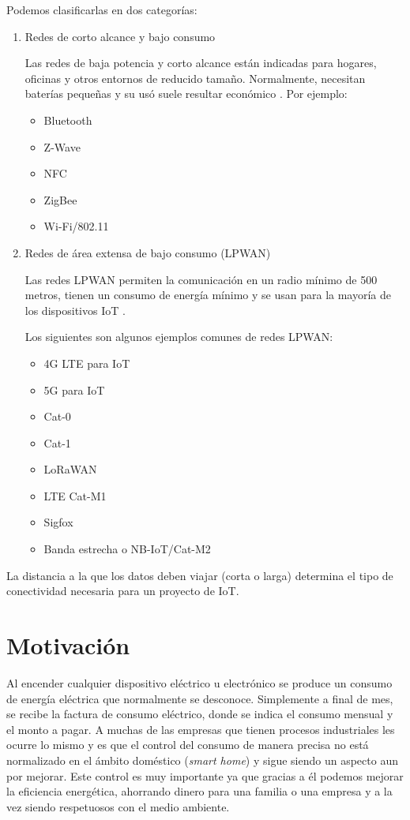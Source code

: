 Podemos clasificarlas en dos categorías:
\begin{enumerate}
\item Redes de corto alcance y bajo consumo 

Las redes de baja potencia y corto alcance están indicadas para hogares, oficinas y otros entornos de reducido tamaño. Normalmente, necesitan baterías pequeñas y su usó suele resultar económico \citep{WEBSITE:15}. Por ejemplo:

\begin{itemize}
\item Bluetooth
\item Z-Wave
\item NFC
\item ZigBee
\item Wi-Fi/802.11
\end{itemize}


\item Redes de área extensa de bajo consumo (LPWAN)

Las redes LPWAN permiten la comunicación en un radio mínimo de 500 metros, tienen un consumo de energía mínimo y se usan para la mayoría de los dispositivos IoT \citep{WEBSITE:15}. 

Los siguientes son algunos ejemplos comunes de redes LPWAN:

\begin{itemize}
\item 4G LTE para IoT
\item 5G para IoT
\item Cat-0
\item Cat-1
\item LoRaWAN
\item LTE Cat-M1
\item Sigfox
\item Banda estrecha o NB-IoT/Cat-M2
\end{itemize}

\end{enumerate}

\vspace{0.5cm}

La distancia a la que los datos deben viajar (corta o larga) determina el tipo de conectividad necesaria para un proyecto de IoT.


\section{Motivación}
Al encender cualquier dispositivo eléctrico u electrónico se produce un consumo de energía eléctrica que normalmente se desconoce. Simplemente a final de mes, se recibe la factura de consumo eléctrico, donde se indica el consumo mensual y el monto a pagar. A muchas de las empresas que tienen procesos industriales les ocurre lo mismo y es que el control del consumo de manera precisa no está normalizado en el ámbito doméstico (\emph{smart home}) y sigue siendo un aspecto aun por mejorar. Este control es muy importante ya que gracias a él podemos mejorar la eficiencia energética, ahorrando dinero para una familia o una empresa y a la vez siendo respetuosos con el medio ambiente.

